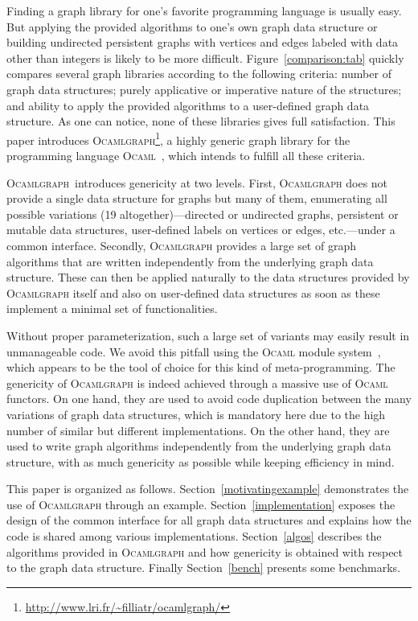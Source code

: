 \documentclass[tfpsymp,pagenumbers]{tfp07symp}
\newcommand{\ocamlgraph}{\textsc{Ocamlgraph}\xspace}
\newcommand{\ocaml}{\textsc{Ocaml}\xspace}
\begin{document}
Finding a graph library for one's favorite programming language is
usually easy. But applying the provided algorithms to one's own graph
data structure or building undirected persistent graphs with vertices
and edges labeled with data other than integers is likely to be more
difficult. Figure~\ref{comparison:tab} quickly compares several graph
libraries according to the following criteria: number of graph data
structures; purely applicative or imperative nature of the structures;
and ability to apply the provided algorithms to a user-defined graph
data structure.  As one can notice, none of these libraries gives full
satisfaction.  This paper introduces
\ocamlgraph\footnote{\url{http://www.lri.fr/~filliatr/ocamlgraph/}}, a
highly generic graph library for the programming language
\ocaml~\cite{ObjectiveCaml}, which intends to fulfill all these
criteria.

\ocamlgraph\ introduces genericity at two levels. First, \ocamlgraph
does not provide a single data structure for graphs but many of them,
enumerating all possible variations (19 altogether)---directed or
undirected graphs, persistent or mutable data structures, user-defined
labels on vertices or edges, etc.---under a common interface.
Secondly, \ocamlgraph provides a large set of graph algorithms that
are written independently from the underlying graph data structure.
These can then be applied naturally to the data structures provided by
\ocamlgraph itself and also on user-defined data structures as soon as
these implement a minimal set of functionalities.

Without proper parameterization, such a large set of variants may
easily result in unmanageable code. We avoid this pitfall using the
\ocaml module system~\cite{leroy00}, which appears to be the tool of
choice for this kind of meta-programming.  The genericity of
\ocamlgraph is indeed achieved through a massive use of \ocaml
functors. On one hand, they are used to avoid code duplication between
the many variations of graph data structures, which is mandatory here
due to the high number of similar but different implementations.  On
the other hand, they are used to write graph algorithms independently
from the underlying graph data structure, with as much genericity as
possible while keeping efficiency in mind.

This paper is organized as follows. Section~\ref{motivatingexample}
demonstrates the use of \ocamlgraph through an example.
Section~\ref{implementation} exposes the design of the common
interface for all graph data structures and explains how the code is
shared among various implementations.  Section~\ref{algos}
describes the algorithms provided in \ocamlgraph and how
genericity  is obtained with respect to the graph data structure.
Finally Section~\ref{bench} presents some benchmarks.
\end{document}
